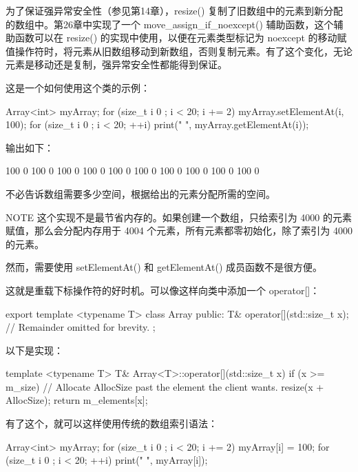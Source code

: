 为了保证强异常安全性（参见第14章），resize() 复制了旧数组中的元素到新分配的数组中。第26章中实现了一个 move\_assign\_if\_noexcept() 辅助函数，这个辅助函数可以在 resize() 的实现中使用，以便在元素类型标记为 noexcept 的移动赋值操作符时，将元素从旧数组移动到新数组，否则复制元素。有了这个变化，无论元素是移动还是复制，强异常安全性都能得到保证。

这是一个如何使用这个类的示例：

\begin{cpp}
Array<int> myArray;
for (size_t i { 0 }; i < 20; i += 2) {
    myArray.setElementAt(i, 100);
}
for (size_t i { 0 }; i < 20; ++i) {
    print("{} ", myArray.getElementAt(i));
}
\end{cpp}

输出如下：

\begin{shell}
100 0 100 0 100 0 100 0 100 0 100 0 100 0 100 0 100 0 100 0
\end{shell}

不必告诉数组需要多少空间，根据给出的元素分配所需的空间。

\begin{myNotic}{NOTE}
这个实现不是最节省内存的。如果创建一个数组，只给索引为 4000 的元素赋值，那么会分配内存用于 4004 个元素，所有元素都零初始化，除了索引为 4000 的元素。
\end{myNotic}

然而，需要使用 setElementAt() 和 getElementAt() 成员函数不是很方便。

这就是重载下标操作符的好时机。可以像这样向类中添加一个 operator[]：

\begin{cpp}
export template <typename T>
class Array
{
    public:
        T& operator[](std::size_t x);
        // Remainder omitted for brevity.
};
\end{cpp}

以下是实现：

\begin{cpp}
template <typename T> T& Array<T>::operator[](std::size_t x)
{
    if (x >= m_size) {
        // Allocate AllocSize past the element the client wants.
        resize(x + AllocSize);
    }
    return m_elements[x];
}
\end{cpp}

有了这个，就可以这样使用传统的数组索引语法：

\begin{cpp}
Array<int> myArray;
for (size_t i { 0 }; i < 20; i += 2) {
    myArray[i] = 100;
}
for (size_t i { 0 }; i < 20; ++i) {
    print("{} ", myArray[i]);
}
\end{cpp}

